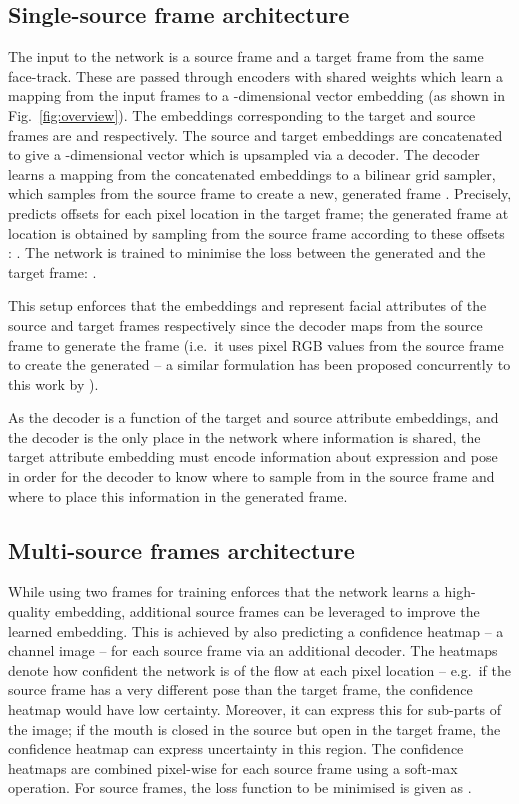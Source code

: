 \documentclass{bmvc2k}
\newcommand{\figref}[1]{Fig.~\ref{#1}}
\begin{document}
\subsection{Single-source frame architecture}
\label{sec:singlesource}
The input to the network is a source frame  and a target frame  from the same face-track.
These are passed through encoders with shared weights which learn a mapping  from the input frames to a -dimensional vector embedding (as shown in \figref{fig:overview}).
The embeddings corresponding to the target and source frames are
  and  respectively.
The source and target embeddings are concatenated to give a -dimensional vector which is upsampled via a decoder.
The decoder learns a mapping  from the concatenated embeddings to a bilinear grid sampler, which samples from the source frame to create a new, generated frame .
Precisely,  predicts offsets  for each pixel location  in the target frame; the generated frame  at location  is obtained by sampling from the source frame  according to these offsets : .
The network is trained to minimise the  loss between the generated and the target frame: .


This setup enforces that the embeddings  and  represent facial attributes of the source and target frames respectively since the decoder maps  from the source frame  to generate the frame  (i.e.\ it uses pixel RGB values from the source frame  to create the generated  -- a similar formulation has been proposed concurrently to this work by \cite{vondrick2018tracking}). 

As the decoder is a function of the target and source attribute embeddings, and the decoder is the only place in the network where information is shared, the target attribute embedding must encode information about expression and pose
in order for the decoder to know where to sample
from in the source frame and where to place this information in the
generated frame.



\subsection{Multi-source frames architecture}
\label{sec:multisource}
While using two frames for training enforces that the network learns a high-quality embedding, additional source frames can be leveraged to improve the learned embedding.
This is achieved by also predicting a confidence heatmap -- a  channel image --  for each source frame via an additional decoder.
The  heatmaps denote how confident the network is of the flow at each pixel location -- e.g.~if the source frame has a very different pose than the target frame, the confidence heatmap would have low certainty.
Moreover, it can express this for sub-parts of the image; if the mouth is closed in the source but open in the target frame, the confidence heatmap can express uncertainty in this region. 
The confidence heatmaps  are combined pixel-wise for each source frame  using a soft-max operation. 
For  source frames, the loss function to be minimised is given as . 
\end{document}
